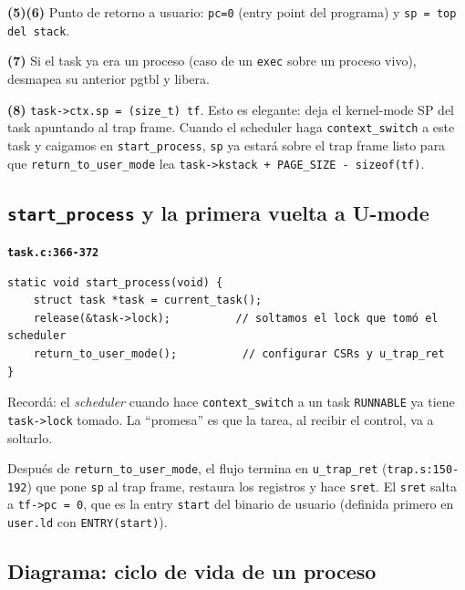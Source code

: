 \documentclass[11pt,a4paper]{article}
\begin{document}
\begin{walkthrough}
\textbf{(5)(6)} Punto de retorno a usuario: \texttt{pc=0} (entry
point del programa) y \texttt{sp = top del stack}.

\textbf{(7)} Si el task ya era un proceso (caso de un \texttt{exec}
sobre un proceso vivo), desmapea su anterior pgtbl y libera.

\textbf{(8)} \texttt{task->ctx.sp = (size\_t) tf}. Esto es elegante:
deja el kernel-mode SP del task apuntando al trap frame. Cuando el
scheduler haga \texttt{context\_switch} a este task y caigamos en
\texttt{start\_process}, \texttt{sp} ya estará sobre el trap frame
listo para que \texttt{return\_to\_user\_mode} lea
\texttt{task->kstack + PAGE\_SIZE - sizeof(tf)}.
\end{walkthrough}

\subsection*{\texttt{start\_process} y la primera vuelta a U-mode}

\begin{walkthrough}
\textbf{\texttt{task.c:366-372}}

\begin{lstlisting}[style=cstyle]
static void start_process(void) {
    struct task *task = current_task();
    release(&task->lock);          // soltamos el lock que tomó el scheduler
    return_to_user_mode();          // configurar CSRs y u_trap_ret
}
\end{lstlisting}

Recordá: el \emph{scheduler} cuando hace \texttt{context\_switch} a
un task \texttt{RUNNABLE} ya tiene \texttt{task->lock} tomado. La
``promesa'' es que la tarea, al recibir el control, va a soltarlo.

Después de \texttt{return\_to\_user\_mode}, el flujo termina en
\texttt{u\_trap\_ret} (\texttt{trap.s:150-192}) que pone \texttt{sp}
al trap frame, restaura los registros y hace \texttt{sret}. El
\texttt{sret} salta a \texttt{tf->pc = 0}, que es la entry
\texttt{start} del binario de usuario (definida primero en
\texttt{user.ld} con \texttt{ENTRY(start)}).
\end{walkthrough}

\subsection*{Diagrama: ciclo de vida de un proceso}
\end{document}
